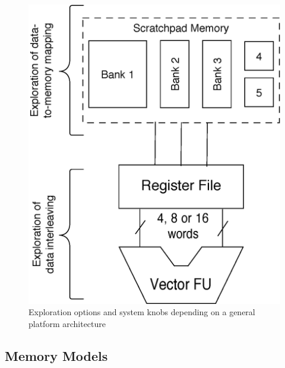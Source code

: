\documentclass[prodmode,acmtecs]{acmsmall}
\begin{document}
\begin{figure}
\centering
	\includegraphics[scale = 0.5]{Images/Architecture.eps} 
	\caption{Exploration options and system knobs depending on a general platform architecture}
	\label{fig:arch}
\end{figure}

\subsection{Memory Models}
\end{document}
